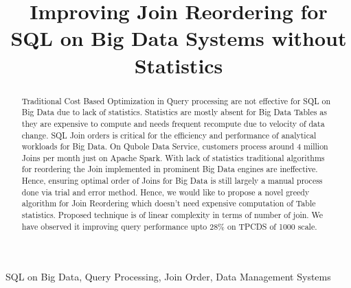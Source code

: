 \documentclass[conference]{IEEEtran}
\begin{document}
\title{Improving Join Reordering for SQL on Big Data Systems without Statistics\\
}

\author{
\and
{}
}

\maketitle

\begin{abstract}
Traditional Cost Based Optimization in Query processing are not effective for SQL on Big Data due to lack of statistics. Statistics are mostly absent for Big Data Tables as they are expensive to compute and needs frequent recompute due to velocity of data change. 
SQL Join orders is critical for the efficiency and performance of analytical workloads for Big Data. On Qubole Data Service, customers process around 4 million Joins per month just on Apache Spark. With lack of statistics traditional algorithms for reordering the Join implemented in prominent Big Data engines are ineffective. Hence, ensuring optimal order of Joins for Big Data  is still largely a manual process done via trial and error method. Hence, we would like to propose a novel greedy algorithm for Join Reordering which doesn't need expensive computation of Table statistics. Proposed technique is of linear complexity in terms of number of join. We have observed it improving query performance upto 28\% on TPCDS of 1000 scale.
\end{abstract}

\begin{IEEEkeywords}
SQL on Big Data, Query Processing, Join Order, Data Management Systems
\end{IEEEkeywords}
\end{document}
